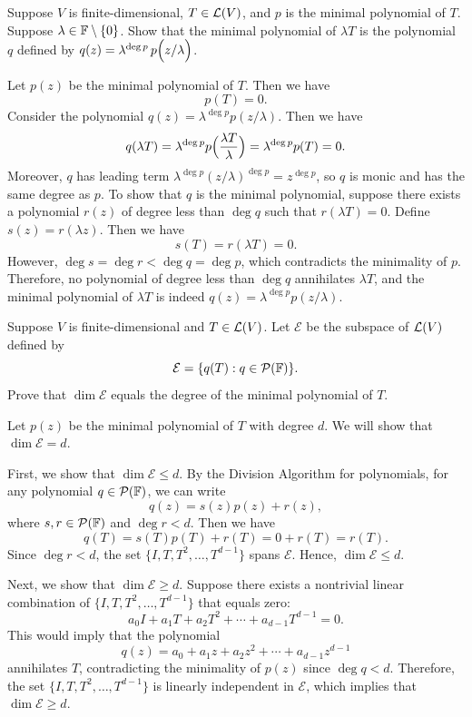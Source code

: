 \begin{exc}
\begin{exercise}
Suppose $V$ is finite-dimensional, $T\in\mathcal{L}(V)$, and $p$ is the minimal
polynomial of $T$. Suppose $\lambda\in\mathbb{F}\setminus\{0\}$. Show that the minimal
polynomial of $\lambda T$ is the polynomial $q$ defined by
$q(z)=\lambda^{\deg p}\,p\Bigl(z/\lambda\Bigr)$.
\end{exercise}
\begin{solution}
Let $p(z)$ be the minimal polynomial of $T$. Then we have
\[ p(T)=0. \]
Consider the polynomial $q(z)=\lambda^{\deg p}p(z/\lambda)$. Then we
have
\[ q(\lambda T)=\lambda^{\deg p}p\Bigl(\frac{\lambda T}{\lambda}\Bigr)
   =\lambda^{\deg p}p(T)=0. \]
Moreover, $q$ has leading term
$\lambda^{\deg p}(z/\lambda)^{\deg p}=z^{\deg p}$, so $q$ is monic and
has the same degree as $p$. To show that $q$ is the minimal polynomial,
suppose there exists a polynomial $r(z)$ of degree less than $\deg q$ such
that $r(\lambda T)=0$. Define $s(z)=r(\lambda z)$. Then we have
\[ s(T)=r(\lambda T)=0. \]
However, $\deg s=\deg r<\deg q=\deg p$, which contradicts the minimality of
$p$. Therefore, no polynomial of degree less than $\deg q$ annihilates
$\lambda T$, and the minimal polynomial of $\lambda T$ is indeed
$q(z)=\lambda^{\deg p}p(z/\lambda)$.
\end{solution}

\begin{exercise}
Suppose $V$ is finite-dimensional and $T\in\mathcal{L}(V)$. Let $\mathcal{E}$ be the
subspace of $\mathcal{L}(V)$ defined by
\[ \mathcal{E}=\{q(T) : q\in\mathcal{P}(\mathbb{F})\}. \]
Prove that $\dim\mathcal{E}$ equals the degree of the minimal polynomial of
$T$.
\end{exercise}
\begin{solution}
Let $p(z)$ be the minimal polynomial of $T$ with degree $d$. We will show that
$\dim\mathcal{E}=d$.

First, we show that $\dim\mathcal{E}\le d$. By the Division Algorithm for
polynomials, for any polynomial $q\in\mathcal{P}(\mathbb{F})$, we can write
\[ q(z)=s(z)p(z)+r(z), \]
where $s,r\in\mathcal{P}(\mathbb{F})$ and $\deg r<d$. Then we have
\[ q(T)=s(T)p(T)+r(T)=0+r(T)=r(T). \]
Since $\deg r<d$, the set $\{I,T,T^2,\dots,T^{d-1}\}$ spans $\mathcal{E}$.
Hence, $\dim\mathcal{E}\le d$.

Next, we show that $\dim\mathcal{E}\ge d$. Suppose there exists a nontrivial
linear combination of $\{I,T,T^2,\dots,T^{d-1}\}$ that equals zero:
\[ a_0I+a_1T+a_2T^2+\cdots+a_{d-1}T^{d-1}=0. \]
This would imply that the polynomial
\[ q(z)=a_0+a_1z+a_2z^2+\cdots+a_{d-1}z^{d-1} \]
annihilates $T$, contradicting the minimality of $p(z)$ since $\deg q<d$.
Therefore, the set $\{I,T,T^2,\dots,T^{d-1}\}$ is linearly independent in
$\mathcal{E}$, which implies that $\dim\mathcal{E}\ge d$.


\end{solution}
\end{exc}
